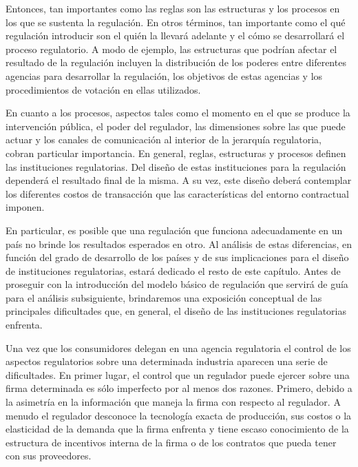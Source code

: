 \documentclass[
  12pt,
  spanish,
]{book}
\begin{document}
Entonces, tan importantes como las reglas son las estructuras y los procesos en los que se sustenta la regulación. En otros términos, tan importante como el qué regulación introducir son el quién la llevará adelante y el cómo se desarrollará el proceso regulatorio. A modo de ejemplo, las estructuras que podrían afectar el resultado de la regulación incluyen la distribución de los poderes entre diferentes agencias para desarrollar la regulación, los objetivos de estas agencias y los procedimientos de votación en ellas utilizados.

En cuanto a los procesos, aspectos tales como el momento en el que se produce la intervención pública, el poder del regulador, las dimensiones sobre las que puede actuar y los canales de comunicación al interior de la jerarquía regulatoria, cobran particular importancia. En general, reglas, estructuras y procesos definen las instituciones regulatorias. Del diseño de estas instituciones para la regulación dependerá el resultado final de la misma. A su vez, este diseño deberá contemplar los diferentes costos de transacción que las características del entorno contractual imponen.

En particular, es posible que una regulación que funciona adecuadamente en un país no brinde los resultados esperados en otro. Al análisis de estas diferencias, en función del grado de desarrollo de los países y de sus implicaciones para el diseño de instituciones regulatorias, estará dedicado el resto de este capítulo. Antes de proseguir con la introducción del modelo básico de regulación que servirá de guía para el análisis subsiguiente, brindaremos una exposición conceptual de las principales dificultades que, en general, el diseño de las instituciones regulatorias enfrenta.

Una vez que los consumidores delegan en una agencia regulatoria el control de los aspectos regulatorios sobre una determinada industria aparecen una serie de dificultades. En primer lugar, el control que un regulador puede ejercer sobre una firma determinada es sólo imperfecto por al menos dos razones. Primero, debido a la asimetría en la información que maneja la firma con respecto al regulador. A menudo el regulador desconoce la tecnología exacta de producción, sus costos o la elasticidad de la demanda que la firma enfrenta y tiene escaso conocimiento de la estructura de incentivos interna de la firma o de los contratos que pueda tener con sus proveedores.
\end{document}
